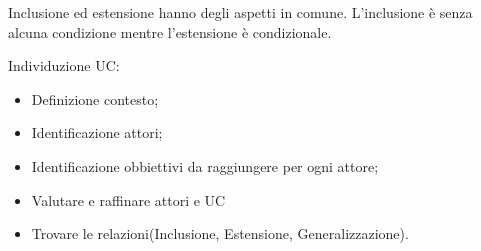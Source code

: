 Inclusione ed estensione hanno degli aspetti in comune. L'inclusione è senza alcuna condizione mentre l'estensione è condizionale.

Individuzione UC:
\begin{itemize}
	\item Definizione contesto;
	\item Identificazione attori;
	\item Identificazione obbiettivi da raggiungere per ogni attore;
	\item Valutare e raffinare attori e UC
	\item Trovare le relazioni(Inclusione, Estensione, Generalizzazione).
\end{itemize}

